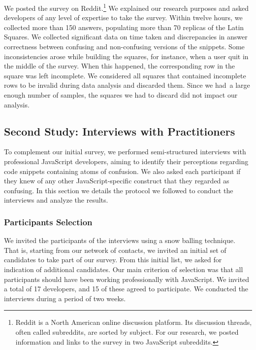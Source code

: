 We posted the survey on Reddit.\footnote{Reddit is a North American online discussion platform.
Its discussion threads, often called subreddits, are sorted by subject. For our research, we posted information and links to the survey in two JavaScript subreddits.} We explained our research purposes and asked developers of any level of expertise to take the survey. Within twelve hours, we collected more than 150 answers, populating more than 70 replicas of the Latin Squares. We collected significant data on time taken and discrepancies in answer correctness between confusing and non-confusing versions of the snippets. Some inconsistencies arose while building the squares, for instance, when a user quit in the middle of the survey. When this happened, the corresponding row in the square was left incomplete. We considered all squares that contained incomplete rows to be invalid during data analysis and discarded them. Since we had\
 a large enough number of samples, the squares we had to discard did not impact our analysis.

 
\subsection{Second Study: Interviews with Practitioners}

To complement our initial survey, we performed semi-structured interviews with professional JavaScript developers, aiming to identify their perceptions regarding code snippets containing atoms of confusion. We also asked each participant if they knew of any other JavaScript-specific construct that they regarded as confusing. In this section we details the protocol we followed to conduct the interviews and analyze the results.


\subsubsection{Participants Selection} We invited the participants of the interviews using a snow balling technique. That is, starting from our network of contacts, we invited an initial set of candidates to take part of our survey. From this initial list, we asked for indication of additional candidates. Our main criterion of selection was that all participants should have been working professionally with JavaScript. We invited a total of 17 developers, and 15 of these agreed to participate. We conducted the interviews during a period of two weeks.


